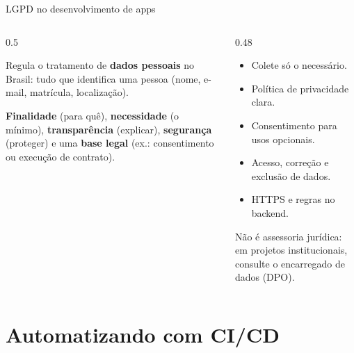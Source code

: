 \documentclass[aspectratio=169,10pt]{beamer}
\begin{document}
\begin{frame}{LGPD no desenvolvimento de apps}
  \begin{columns}[T]
    \begin{column}{0.5\textwidth}
      \begin{conceito}
        Regula o tratamento de \textbf{dados pessoais} no Brasil: tudo que identifica uma pessoa (nome, e-mail, matrícula, localização).
      \end{conceito}
      \begin{conceito}
        \textbf{Finalidade} (para quê), \textbf{necessidade} (o mínimo), \textbf{transparência} (explicar), \textbf{segurança} (proteger) e uma \textbf{base legal} (ex.: consentimento ou execução de contrato).
      \end{conceito}
    \end{column}
    \begin{column}{0.48\textwidth}
      \begin{dica}
        \begin{itemize}
          \item Colete só o necessário.
          \item Política de privacidade clara.
          \item Consentimento para usos opcionais.
          \item Acesso, correção e exclusão de dados.
          \item HTTPS e regras no backend.
        \end{itemize}
      \end{dica}
      \begin{atencao}
        Não é assessoria jurídica: em projetos institucionais, consulte o encarregado de dados (DPO).
      \end{atencao}
    \end{column}
  \end{columns}
\end{frame}

\section{Automatizando com CI/CD}
\end{document}
